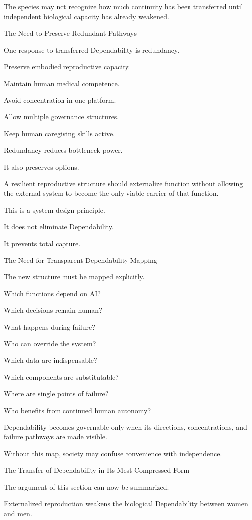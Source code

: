 The species may not recognize how much continuity has been transferred until independent biological capacity has already weakened.

The Need to Preserve Redundant Pathways

One response to transferred Dependability is redundancy.

Preserve embodied reproductive capacity.

Maintain human medical competence.

Avoid concentration in one platform.

Allow multiple governance structures.

Keep human caregiving skills active.

Redundancy reduces bottleneck power.

It also preserves options.

A resilient reproductive structure should externalize function without allowing the external system to become the only viable carrier of that function.

This is a system-design principle.

It does not eliminate Dependability.

It prevents total capture.

The Need for Transparent Dependability Mapping

The new structure must be mapped explicitly.

Which functions depend on AI?

Which decisions remain human?

What happens during failure?

Who can override the system?

Which data are indispensable?

Which components are substitutable?

Where are single points of failure?

Who benefits from continued human autonomy?

Dependability becomes governable only when its directions, concentrations, and failure pathways are made visible.

Without this map, society may confuse convenience with independence.

The Transfer of Dependability in Its Most Compressed Form

The argument of this section can now be summarized.

Externalized reproduction weakens the biological Dependability between women and men.

